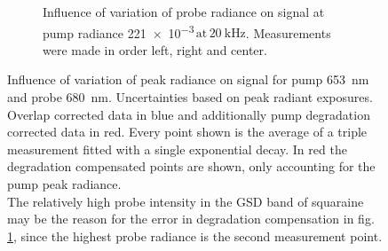 \documentclass[twoside,openright]{scrreprt}
\def\frep#1{\ensuremath{\,\mathrm{at}\, \SI{#1}{\kilo\hertz}}}
\begin{document}
{\begin{figure}[hbtp]
\begin{subfigure}[t]{0.5\linewidth}
\caption{Influence of variation of probe radiance on signal at pump radiance \SI{221e-3}{\radExp}\frep{20}. Measurements were made in order left, right and center.\label{fig:PowerVarProbe}}
\end{subfigure}
\caption{Influence of variation of peak radiance on signal for pump \SI{653}{\nano\meter} and probe \SI{680}{\nano\meter}. Uncertainties based on peak radiant exposures.
Overlap corrected data in blue and additionally pump degradation corrected data in red. Every point shown is the average of a triple measurement fitted with a single exponential decay. In red the degradation compensated points are shown, only accounting for the pump peak radiance.\\ The relatively high probe intensity in the GSD band of squaraine  may be the reason for the error in degradation compensation in fig. \ref{fig:PowerVarProbe}, since the highest probe radiance is the second measurement point. \label{fig:PowerVarRaw}}
\end{figure}

}
\end{document}
